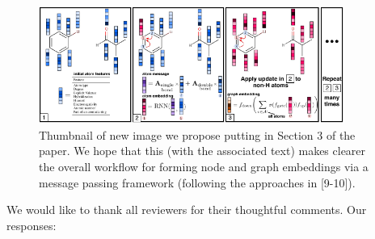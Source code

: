 \documentclass{article}
\begin{document}


\begin{figure}
\centering
  \includegraphics[width=10cm]{graph_nn.pdf}
 \caption{Thumbnail of new image we propose  putting in Section 3 of the paper. We hope that this (with the associated text) makes clearer the overall workflow for forming node and graph embeddings via a message passing framework (following the approaches in [9-10]).}
 \label{fig:new-diagram}
 \vspace{-4ex}
\end{figure}

We would like to thank all reviewers for their thoughtful comments. 
Our responses:

\vspace{-8pt}
\end{document}
